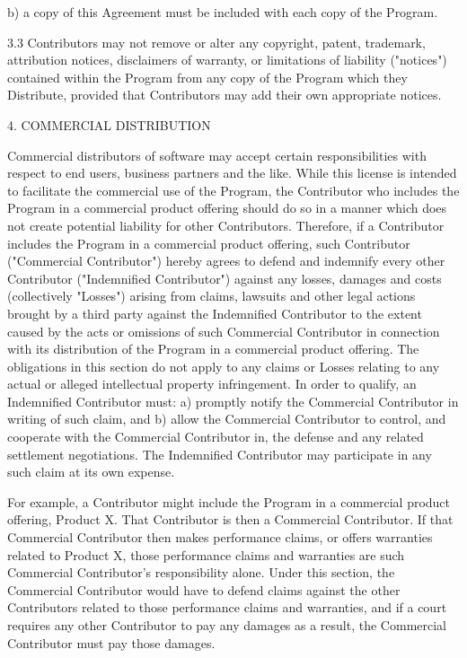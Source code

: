 b) a copy of this Agreement must be included with each copy of
the Program.

3.3 Contributors may not remove or alter any copyright, patent,
trademark, attribution notices, disclaimers of warranty, or limitations
of liability ("notices") contained within the Program from any copy of
the Program which they Distribute, provided that Contributors may add
their own appropriate notices.

4. COMMERCIAL DISTRIBUTION

Commercial distributors of software may accept certain responsibilities
with respect to end users, business partners and the like. While this
license is intended to facilitate the commercial use of the Program,
the Contributor who includes the Program in a commercial product
offering should do so in a manner which does not create potential
liability for other Contributors. Therefore, if a Contributor includes
the Program in a commercial product offering, such Contributor
("Commercial Contributor") hereby agrees to defend and indemnify every
other Contributor ("Indemnified Contributor") against any losses,
damages and costs (collectively "Losses") arising from claims, lawsuits
and other legal actions brought by a third party against the Indemnified
Contributor to the extent caused by the acts or omissions of such
Commercial Contributor in connection with its distribution of the Program
in a commercial product offering. The obligations in this section do not
apply to any claims or Losses relating to any actual or alleged
intellectual property infringement. In order to qualify, an Indemnified
Contributor must: a) promptly notify the Commercial Contributor in
writing of such claim, and b) allow the Commercial Contributor to control,
and cooperate with the Commercial Contributor in, the defense and any
related settlement negotiations. The Indemnified Contributor may
participate in any such claim at its own expense.

For example, a Contributor might include the Program in a commercial
product offering, Product X. That Contributor is then a Commercial
Contributor. If that Commercial Contributor then makes performance
claims, or offers warranties related to Product X, those performance
claims and warranties are such Commercial Contributor's responsibility
alone. Under this section, the Commercial Contributor would have to
defend claims against the other Contributors related to those performance
claims and warranties, and if a court requires any other Contributor to
pay any damages as a result, the Commercial Contributor must pay
those damages.

